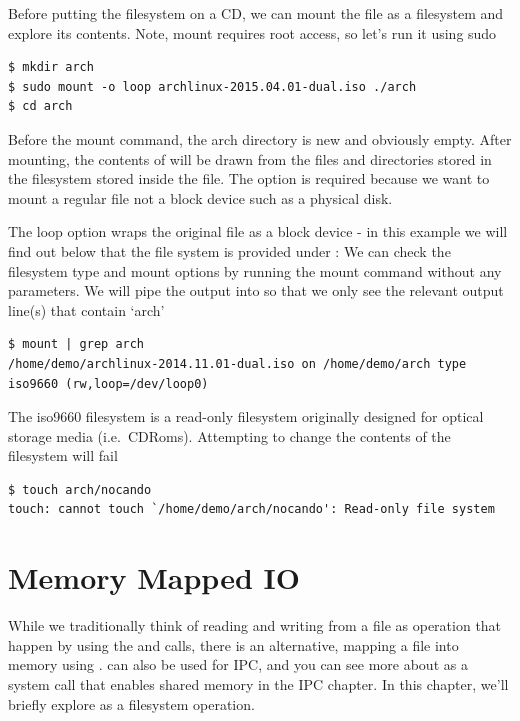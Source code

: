 Before putting the filesystem on a CD, we can mount the file as a filesystem and explore its contents. Note, mount requires root access, so let's run it using sudo

\begin{lstlisting}
$ mkdir arch
$ sudo mount -o loop archlinux-2015.04.01-dual.iso ./arch
$ cd arch
\end{lstlisting}

Before the mount command, the arch directory is new and obviously empty. After mounting, the contents of  will be drawn from the files and directories stored in the filesystem stored inside the  file. The  option is required because we want to mount a regular file not a block device such as a physical disk.

The loop option wraps the original file as a block device - in this example we will find out below that the file system is provided under  : We can check the filesystem type and mount options by running the mount command without any parameters. We will pipe the output into  so that we only see the relevant output line(s) that contain `arch'

\begin{lstlisting}
$ mount | grep arch
/home/demo/archlinux-2014.11.01-dual.iso on /home/demo/arch type iso9660 (rw,loop=/dev/loop0)
\end{lstlisting}

The iso9660 filesystem is a read-only filesystem originally designed for optical storage media (i.e.~CDRoms). Attempting to change the contents of the filesystem will fail

\begin{lstlisting}
$ touch arch/nocando
touch: cannot touch `/home/demo/arch/nocando': Read-only file system
\end{lstlisting}

\section{Memory Mapped IO}

While we traditionally think of reading and writing from a file as operation that happen by using the  and  calls, there is an alternative, mapping a file into memory using .  can also be used for IPC, and you can see more about  as a system call that enables shared memory in the IPC chapter. In this chapter, we'll briefly explore  as a filesystem operation.

